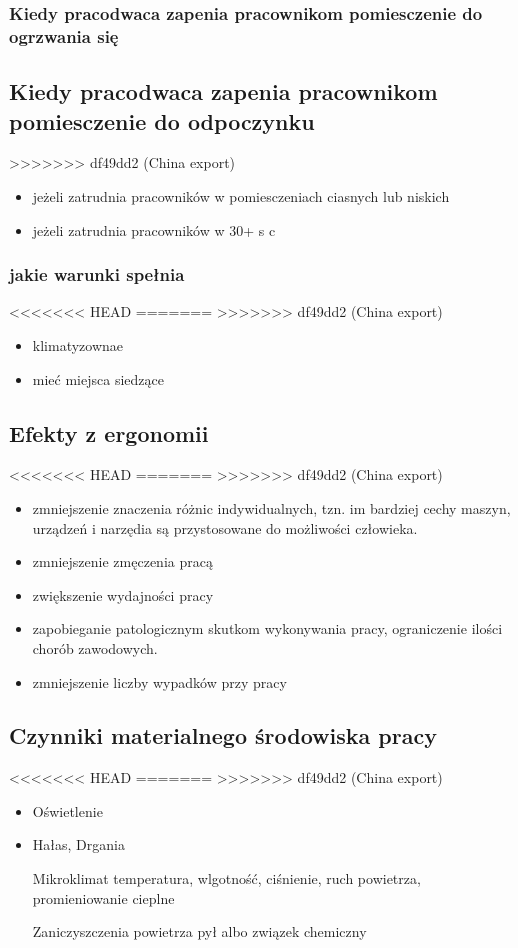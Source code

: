 \documentclass[11pt]{article}
\begin{document}
\begin{enumerate}
\subsubsection{Kiedy pracodwaca zapenia pracownikom pomiesczenie do ogrzwania się}
\label{sec:org34f5f6f}

\subsection{Kiedy pracodwaca zapenia pracownikom pomiesczenie do odpoczynku}
\label{sec:org6c7e529}
>>>>>>> df49dd2 (China export)
\begin{itemize}
\item jeżeli zatrudnia pracowników w pomiesczeniach ciasnych lub niskich
\item jeżeli zatrudnia pracowników w 30+ s c
\end{itemize}
\subsubsection{jakie warunki spełnia}
<<<<<<< HEAD
\label{sec:org40b035c}
=======
\label{sec:org0daa854}
>>>>>>> df49dd2 (China export)
\begin{itemize}
\item klimatyzownae
\item mieć miejsca siedzące
\end{itemize}
\subsection{Efekty z ergonomii}
<<<<<<< HEAD
\label{sec:org0b72d5b}
=======
\label{sec:org8ba4d18}
>>>>>>> df49dd2 (China export)
\begin{itemize}
\item zmniejszenie znaczenia różnic indywidualnych, tzn. im bardziej cechy maszyn, urządzeń i narzędia są przystosowane do możliwości człowieka.
\item zmniejszenie zmęczenia pracą
\item zwiększenie wydajności pracy
\item zapobieganie patologicznym skutkom wykonywania pracy, ograniczenie ilości chorób zawodowych.
\item zmniejszenie liczby wypadków przy pracy
\end{itemize}
\subsection{Czynniki materialnego środowiska pracy}
<<<<<<< HEAD
\label{sec:org5ec75dd}
=======
\label{sec:org4d31d24}
>>>>>>> df49dd2 (China export)
\begin{itemize}
\item Oświetlenie
\item Hałas, Drgania
\item[{Mikroklimat}] temperatura, wlgotność, ciśnienie, ruch powietrza, promieniowanie cieplne
\item[{Zaniczyszczenia powietrza}] pył albo związek chemiczny
\end{itemize}

\end{enumerate}
\end{document}
